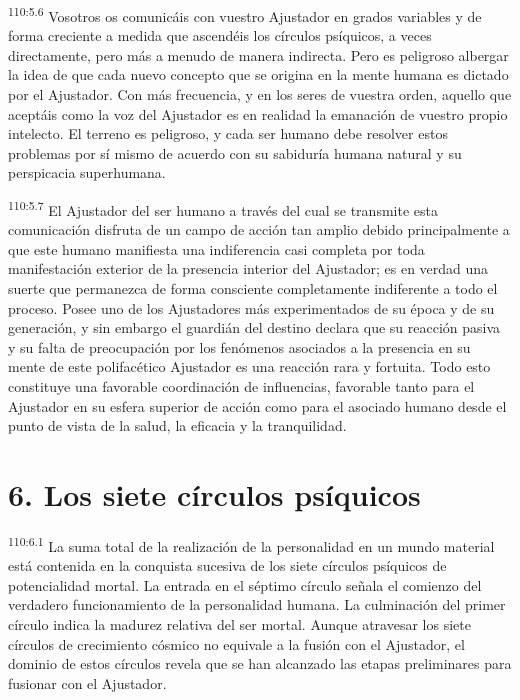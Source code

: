 \documentclass[twoside, 11pt]{book}
\begin{document}
\par
\textsuperscript{110:5.6} Vosotros os comunicáis con vuestro Ajustador en grados variables y de forma creciente a medida que ascendéis los círculos psíquicos, a veces directamente, pero más a menudo de manera indirecta. Pero es peligroso albergar la idea de que cada nuevo concepto que se origina en la mente humana es dictado por el Ajustador. Con más frecuencia, y en los seres de vuestra orden, aquello que aceptáis como la voz del Ajustador es en realidad la emanación de vuestro propio intelecto. El terreno es peligroso, y cada ser humano debe resolver estos problemas por sí mismo de acuerdo con su sabiduría humana natural y su perspicacia superhumana.

\par
\textsuperscript{110:5.7} El Ajustador del ser humano a través del cual se transmite esta comunicación disfruta de un campo de acción tan amplio debido principalmente a que este humano manifiesta una indiferencia casi completa por toda manifestación exterior de la presencia interior del Ajustador; es en verdad una suerte que permanezca de forma consciente completamente indiferente a todo el proceso. Posee uno de los Ajustadores más experimentados de su época y de su generación, y sin embargo el guardián del destino declara que su reacción pasiva y su falta de preocupación por los fenómenos asociados a la presencia en su mente de este polifacético Ajustador es una reacción rara y fortuita. Todo esto constituye una favorable coordinación de influencias, favorable tanto para el Ajustador en su esfera superior de acción como para el asociado humano desde el punto de vista de la salud, la eficacia y la tranquilidad.

\section*{6. Los siete círculos psíquicos}
\par
\textsuperscript{110:6.1} La suma total de la realización de la personalidad en un mundo material está contenida en la conquista sucesiva de los siete círculos psíquicos de potencialidad mortal. La entrada en el séptimo círculo señala el comienzo del verdadero funcionamiento de la personalidad humana. La culminación del primer círculo indica la madurez relativa del ser mortal. Aunque atravesar los siete círculos de crecimiento cósmico no equivale a la fusión con el Ajustador, el dominio de estos círculos revela que se han alcanzado las etapas preliminares para fusionar con el Ajustador.
\end{document}
